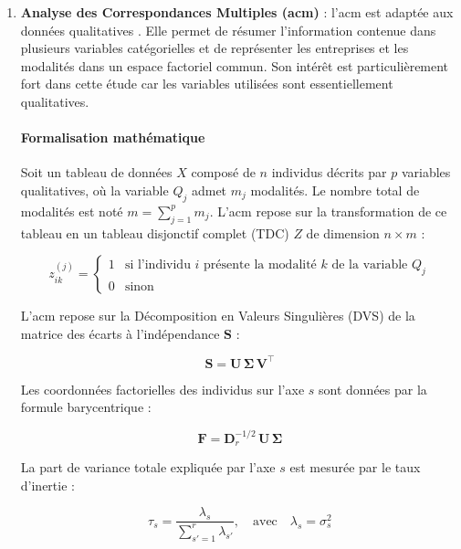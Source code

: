 \documentclass[12pt, a4paper, oneside]{report}
\begin{document}
\begin{enumerate}
  \item \textbf{Analyse des Correspondances Multiples (\gls{acm})} : l'\gls{acm} est adaptée aux données qualitatives \cite{lebart1994}. Elle permet de résumer l'information contenue dans plusieurs variables catégorielles et de représenter les entreprises et les modalités dans un espace factoriel commun. Son intérêt est particulièrement fort dans cette étude car les variables utilisées sont essentiellement qualitatives.

  \paragraph{Formalisation mathématique}

  Soit un tableau de données $X$ composé de $n$ individus décrits par $p$ variables qualitatives, où la variable $Q_j$ admet $m_j$ modalités. Le nombre total de modalités est noté $m = \sum_{j=1}^{p} m_j$. L'\gls{acm} repose sur la transformation de ce tableau en un tableau disjonctif complet (TDC) $Z$ de dimension $n \times m$ :

  \begin{equation}
    z_{ik}^{(j)} =
    \begin{cases}
      1 & \text{si l'individu } i \text{ présente la modalité } k \text{ de la variable } Q_j \\
      0 & \text{sinon}
    \end{cases}
    \label{eq:tdc}
  \end{equation}

  L'\gls{acm} repose sur la Décomposition en Valeurs Singulières (DVS) de la matrice des écarts à l'indépendance $\mathbf{S}$ :

  \begin{equation}
    \mathbf{S} = \mathbf{U}\,\boldsymbol{\Sigma}\,\mathbf{V}^{\top}
    \label{eq:svd}
  \end{equation}

  Les coordonnées factorielles des individus sur l'axe $s$ sont données par la formule barycentrique :

  \begin{equation}
    \boxed{\mathbf{F} = \mathbf{D}_r^{-1/2}\,\mathbf{U}\,\boldsymbol{\Sigma}}
    \label{eq:proj_individus}
  \end{equation}

  La part de variance totale expliquée par l'axe $s$ est mesurée par le taux d'inertie :

  \begin{equation}
    \tau_s = \frac{\lambda_s}{\displaystyle\sum_{s'=1}^{r} \lambda_{s'}}, \quad \text{avec} \quad \lambda_s = \sigma_s^2
    \label{eq:inertie}
  \end{equation}


\end{enumerate}
\end{document}
